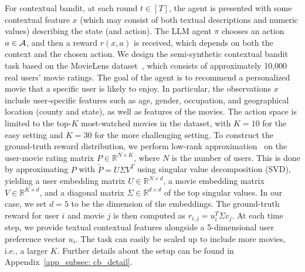 For contextual bandit, at each round $t\in[T]$, the agent is presented with some contextual feature $x$ (which may consist of both textual descriptions and numeric values) describing the state (and action). The LLM agent $\pi$ chooses an action $a \in {\mathcal{A}}$, and then a reward $r(x, a)$ is received, which depends on both the context and the chosen action. 
We design the semi-synthetic contextual bandit task based on the MovieLens dataset~\citep{harper2015movielens}, which consists of approximately 10,000 real users' movie ratings. 
The goal of the agent is to recommend a personalized movie that a specific user is likely to enjoy.
In particular, the observations $x$ include user-specific features such as age, gender, occupation, and geographical location (county and state), as well as features of the movies. The action space is limited to the top-$K$ most-watched movies in the dataset, with $K=10$ for the easy setting and $K=30$ for the more challenging setting. To construct the ground-truth reward distribution, we perform low-rank approximation~\citep{koren2009matrix} on the user-movie rating matrix $P \in \mathbb{R}^{N \times K}$, where $N$ is the number of users. 
This is done by approximating $P$ with $\tilde{P} = U \Sigma V^T$ using singular value decomposition (SVD), yielding a user embedding matrix $U \in \mathbb{R}^{N \times d}$, a movie embedding matrix $V \in \mathbb{R}^{K \times d}$, and a diagonal matrix $\Sigma \in \mathbb{R}^{d \times d}$ of the top singular values. In our case, we set $d=5$ to be the dimension of the embeddings. The ground-truth reward for user $i$ and movie $j$ is then computed as $r_{i,j} = u_i^T \Sigma v_j$.
At each time step, we provide textual contextual features alongside a 5-dimensional user preference vector $u_i$.
The task can easily be scaled up to include more movies, i.e., a larger $K$.
Further details about the setup can be found in Appendix~\ref{app_subsec: cb_detail}.
